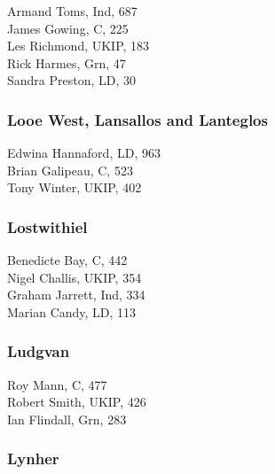 \documentclass[a4paper,openany,10pt]{book}
\begin{document}


Armand Toms, Ind, 687\\
James Gowing, C, 225\\
Les Richmond, UKIP, 183\\
Rick Harmes, Grn, 47\\
Sandra Preston, LD, 30\\


\subsubsection*{Looe West, Lansallos and Lanteglos}



Edwina Hannaford, LD, 963\\
Brian Galipeau, C, 523\\
Tony Winter, UKIP, 402\\


\subsubsection*{Lostwithiel}



Benedicte Bay, C, 442\\
Nigel Challis, UKIP, 354\\
Graham Jarrett, Ind, 334\\
Marian Candy, LD, 113\\


\subsubsection*{Ludgvan}



Roy Mann, C, 477\\
Robert Smith, UKIP, 426\\
Ian Flindall, Grn, 283\\


\subsubsection*{Lynher}

\end{document}
